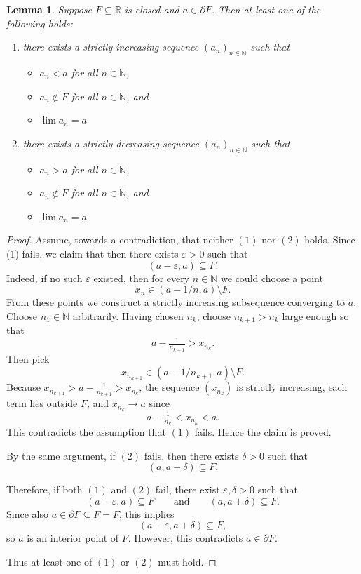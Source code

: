 \documentclass[12pt]{amsart}
\newtheorem{lem}[thm]{Lemma}
\theoremstyle{definition}
\def\bb{\mathbb}
\def\bb{\mathbb}
\begin{document}
\begin{lem}\label{lem boundary seq}
Suppose \(F\subseteq \mathbb R\) is closed and \(a\in \partial F\). Then at least one of the following holds:
\begin{enumerate}
\item[{\rm (1)}] there exists a strictly increasing sequence \((a_n)_{n\in \bb N}\) such that
\begin{itemize}
    \item $a_n<a$ for all $n\in \bb N$,
    \item $a_n\notin F$ for all $n\in \bb N$, and 
    \item $\lim a_n=a$
\end{itemize}
\item[{\rm (2)}] there exists a strictly decreasing sequence \((a_n)_{n\in \bb N}\) such that
\begin{itemize}
    \item $a_n>a$ for all $n\in \bb N$,
    \item $a_n\notin F$ for all $n\in \bb N$, and 
    \item $\lim a_n=a$
\end{itemize}
\end{enumerate}
\end{lem}

\begin{proof}
Assume, towards a contradiction, that neither \((1)\) nor \((2)\) holds.  Since (1) fails, we claim that then there exists \(\varepsilon>0\) such that
\[
(a-\varepsilon,a)\subseteq F.
\]
Indeed, if no such \(\varepsilon\) existed, then for every \(n\in \mathbb N\) we could choose a point
\[
x_n\in (a-1/n,a)\setminus F.
\]
From these points we construct a strictly increasing subsequence converging to \(a\). Choose \(n_1\in \mathbb N\) arbitrarily. Having chosen \(n_k\), choose \(n_{k+1}>n_k\) large enough so that
\[
a-\tfrac1{n_{k+1}} > x_{n_k}.
\]
Then pick
\[
x_{n_{k+1}}\in (a-1/n_{k+1},a)\setminus F.
\]
Because \(x_{n_{k+1}}>a-\tfrac1{n_{k+1}}>x_{n_k}\), the sequence \((x_{n_k})\) is strictly increasing, each term lies outside \(F\), and \(x_{n_k}\to a\) since
\[
a-\tfrac1{n_k}<x_{n_k}<a.
\]
This contradicts the assumption that \((1)\) fails. Hence the claim is proved.

By the same argument, if \((2)\) fails, then there exists \(\delta>0\) such that
\[
(a,a+\delta)\subseteq F.
\]

Therefore, if both \((1)\) and \((2)\) fail, there exist \(\varepsilon,\delta>0\) such that
\[
(a-\varepsilon,a)\subseteq F
\qquad\text{and}\qquad
(a,a+\delta)\subseteq F.
\]
Since also \(a\in \partial F\subseteq \overline F=F\), this implies
\[
(a-\varepsilon,a+\delta)\subseteq F,
\]
so \(a\) is an interior point of \(F\). However, this contradicts \(a\in \partial F\).

Thus at least one of \((1)\) or \((2)\) must hold.
\end{proof}
\end{document}
